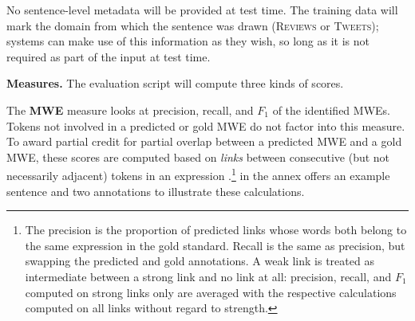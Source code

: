 \documentclass[11pt]{article}
\newcommand{\ensuretext}[1]{#1}
\newcommand{\nssmarker}{\ensuretext{\textcolor{magenta}{\ensuremath{^{\textsc{NS}}_{\textsc{S}}}}}}
\newcommand{\dhmarker}{\ensuretext{\textcolor{red}{\ensuremath{^{\textsc{D}}_{\textsc{H}}}}}}
\newcommand{\arkcomment}[3]{\ensuretext{\textcolor{#3}{[#1 #2]}}}
\newcommand{\nss}[1]{\arkcomment{\nssmarker}{#1}{magenta}}
\newcommand{\dirk}[1]{\arkcomment{\dhmarker}{#1}{red}}
\newcommand{\longversion}[1]{} %
\begin{document}
\longversion{The sentences provided for this task are tokenized. 
For evaluation to be possible, system predictions must respect the input tokenization.}

No sentence-level metadata will be provided at test time. 
The training data will mark the domain from which the sentence was drawn 
(\textsc{Reviews} or \textsc{Tweets}); systems can make use of this information as they wish, 
so long as it is not required as part of the input at test time.



\textbf{Measures.}
The evaluation script will compute three kinds of scores.

The \textbf{MWE} measure looks at precision, recall, and $F_1$ 
of the identified MWEs. Tokens not involved in a predicted or gold MWE
do not factor into this measure. 
To award partial credit for partial overlap between a predicted MWE 
and a gold MWE, these scores are computed based on \emph{links} between 
consecutive (but not necessarily adjacent) tokens in an expression \citep{schneider-14}.\footnote{%
The precision is the proportion of predicted links whose words 
both belong to the same expression in the gold standard. 
Recall is the same as precision, but swapping the predicted and gold annotations.\longversion{\footnote{This computation on the basis of links 
is a slight simplification of the MUC coreference measure \citep{vilain-95}.}}
A weak link is treated as intermediate between a strong link and no link at all: 
precision, recall, and $F_1$ computed on strong links only are averaged 
with the respective calculations computed on all links without regard to strength.} 
 in the annex offers an example sentence and two annotations 
to illustrate these calculations.
\end{document}
